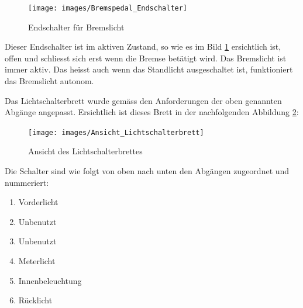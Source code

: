 \begin{itemize}
\begin{figure}[h!]
	\centering
		\texttt{[image: images/Bremspedal\_Endschalter]}
	\caption{Endschalter für Bremslicht}
	\label{fig:EndschalterBremslicht}
\end{figure}

Dieser Endschalter ist im aktiven Zustand, so wie es im Bild \ref{fig:EndschalterBremslicht} ersichtlich ist, offen und schliesst sich erst wenn die Bremse betätigt wird. Das Bremslicht ist immer aktiv. Das heisst auch wenn das Standlicht ausgeschaltet ist, funktioniert das Bremslicht autonom.

\end{itemize}

\newpage

Das Lichtschalterbrett wurde  gemäss den Anforderungen der oben genannten Abgänge angepasst. Ersichtlich ist dieses Brett in der nachfolgenden Abbildung \ref{fig:AnsichtLichtschalterbrett}:

\begin{figure}[h!]
	\centering
		\texttt{[image: images/Ansicht\_Lichtschalterbrett]}
	\caption{Ansicht des Lichtschalterbrettes}
	\label{fig:AnsichtLichtschalterbrett}
\end{figure}

Die Schalter sind wie folgt von oben nach unten den Abgängen zugeordnet und nummeriert:

\begin{enumerate}
\item Vorderlicht
\item Unbenutzt
\item Unbenutzt
\item Meterlicht
\item Innenbeleuchtung
\item Rücklicht
\end{enumerate}

\color{black}
\newpage